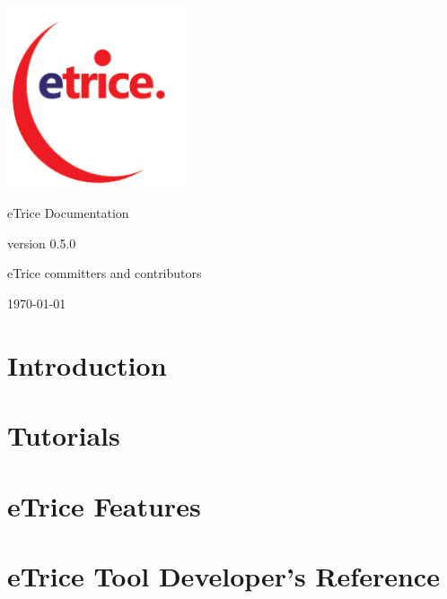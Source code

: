 \documentclass[a4paper,oneside,10pt]{book}
\newcommand{\eTrice}{{\color{blue}e}{\color{red}Trice}{}}
\begin{document}
\begin{titlepage}

\begin{center}

\includegraphics[width=0.4\textwidth]{images/logo/eTRICE-logo.png}

\Huge \eTrice{} Documentation

\Large version 0.5.0

\large \eTrice{} committers and contributors

\vfill

{\large \today}

\end{center}

\end{titlepage}

\tableofcontents

\chapter{Introduction}




\chapter{Tutorials}












\chapter{eTrice Features}






%
%
%





\chapter{eTrice{} Tool Developer's Reference}


\end{document}
